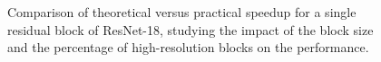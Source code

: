 \begin{figure}[!tb]
\centering
{}
\hfil
{}
\caption{Comparison of theoretical versus practical speedup for a single residual block of ResNet-18, studying the impact of the block size and the percentage of high-resolution blocks on the performance.}
\end{figure}
